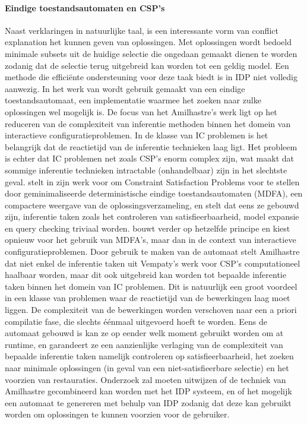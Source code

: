 \paragraph{Eindige toestandsautomaten en CSP's}
Naast verklaringen in natuurlijke taal, is een interessante vorm van conflict explanation het kunnen geven van oplossingen. Met oplossingen wordt bedoeld minimale subsets uit de huidige selectie die ongedaan gemaakt dienen te worden zodanig dat de selectie terug uitgebreid kan worden tot een geldig model. Een methode die effici\"{e}nte ondersteuning voor deze taak biedt is in IDP niet volledig aanwezig. In het werk van \citep{amilhastre2002consistency} wordt gebruik gemaakt van een eindige toestandsautomaat, een implementatie waarmee het zoeken naar zulke oplossingen wel mogelijk is. De focus van het Amilhastre's werk ligt op het reduceren van de complexiteit van inferentie methoden binnen het domein van interactieve configuratieproblemen. In de klasse van IC problemen is het belangrijk dat de reactietijd van de inferentie technieken laag ligt. Het probleem is echter dat IC problemen net zoals CSP's enorm complex zijn, wat maakt dat sommige inferentie technieken intractable (onhandelbaar) zijn in het slechtste geval. \citep{vempaty1992solving} stelt in zijn werk voor om Constraint Satisfaction Problems voor te stellen door geminimaliseerde deterministische eindige toestandsautomaten (MDFA), een compactere weergave van de oplossingsverzameling, en stelt dat eens ze gebouwd zijn, inferentie taken zoals het controleren van satisfieerbaarheid, model expansie en query checking triviaal worden. \citep{amilhastre2002consistency} bouwt verder op hetzelfde principe en kiest opnieuw voor het gebruik van MDFA's, maar dan in de context van interactieve configuratieproblemen. Door gebruik te maken van de automaat stelt Amilhastre dat niet enkel de inferentie taken uit Vempaty's werk voor CSP's computationeel haalbaar worden, maar dit ook uitgebreid kan worden tot bepaalde inferentie taken binnen het domein van IC problemen. Dit is natuurlijk een groot voordeel in een klasse van problemen waar de reactietijd van de bewerkingen laag moet liggen. De complexiteit van de bewerkingen worden verschoven naar een a priori compilatie fase, die slechts \'{e}\'{e}nmaal uitgevoerd hoeft te worden. Eens de automaat gebouwd is kan ze op eender welk moment gebruikt worden om at runtime, en garandeert ze een aanzienlijke verlaging van de complexiteit van bepaalde inferentie taken namelijk controleren op satisfieerbaarheid, het zoeken naar minimale oplossingen (in geval van een niet-satisfieerbare selectie) en het voorzien van restauraties. Onderzoek zal moeten uitwijzen of de techniek van Amilhastre gecombineerd kan worden met het IDP systeem, en of het mogelijk een automaat te genereren met behulp van IDP zodanig dat deze kan gebruikt worden om oplossingen te kunnen voorzien voor de gebruiker.

